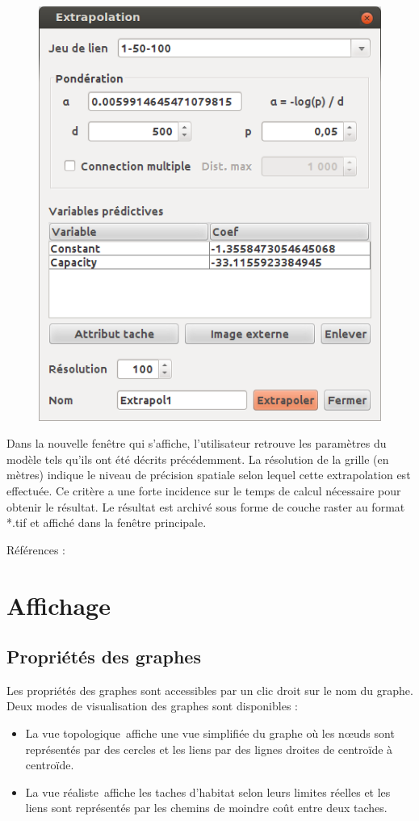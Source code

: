 \documentclass{article}
\begin{document}
\begin{figure}[H]
	\includegraphics[scale=0.5]{img/manual-fr_img16.png} 
\end{figure}

Dans la nouvelle fenêtre qui s’affiche, l’utilisateur retrouve les paramètres du modèle tels qu’ils ont été décrits précédemment. La résolution de la grille (en mètres) indique le niveau de précision spatiale selon lequel cette extrapolation est effectuée. Ce critère a une forte incidence sur le temps de calcul nécessaire pour obtenir le résultat. Le résultat est archivé sous forme de couche raster au format *.tif et affiché dans la fenêtre principale.

\bigskip
Références : \cite{2012_SDM, 2012_graphab_EMS, 2013_SDM, 2013_SDM_rainette}


\section{Affichage}

\subsection{Propriétés des graphes}

Les propriétés des graphes sont accessibles par un clic droit sur le nom du graphe. Deux modes de visualisation des graphes sont disponibles : 
\begin{itemize}
	\item La vue topologique~affiche une vue simplifiée du graphe où les nœuds sont représentés par des cercles et les liens par des lignes droites de centroïde à centroïde. 
	\item La vue réaliste~affiche les taches d’habitat selon leurs limites réelles et les liens sont représentés par les chemins de moindre coût entre deux taches.  
\end{itemize}
\end{document}
